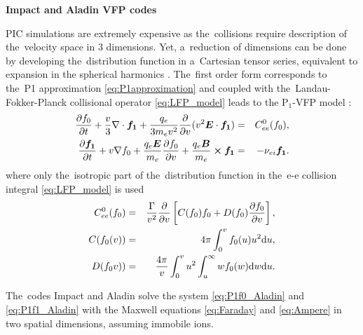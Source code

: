 \textbf{Impact and Aladin VFP codes}

PIC simulations are extremely expensive as the~collisions require description 
of the~velocity space in 3 dimensions. Yet, a~reduction of dimensions can be 
done by developing the~distribution function in a~Cartesian tensor series, 
equivalent to expansion in the spherical harmonics \cite{Johnston_PR1960}.
The~first order form corresponds to the~P1 approximation 
\eqref{eq:P1approximation} and coupled with
the~Landau-Fokker-Planck collisional operator 
\eqref{eq:LFP_model} leads to the P$_1$-VFP model 
\cite{Johnston_PR1960, Kingham_JCP2004}:
\begin{eqnarray}
\frac{\partial f_0}{\partial t}+\frac{v}{3}\nabla \cdot {\boldsymbol{f_1}}
+\frac{q_e}{3m_ev^2}\frac{\partial}{\partial v}(v^2\boldsymbol{E}\cdot {\boldsymbol{f_1}})
&=&
C^0_{ee}(f_0) ,
 \label{eq:P1f0_Aladin}\\
\frac{\partial {\boldsymbol{f_1}}}{\partial t}+v\nabla f_0
+ \frac{q_e\boldsymbol{E}}{m_e}\frac{\partial f_0}{\partial v}
+\frac{q_e\boldsymbol{B}}{m_e}\boldsymbol{\times} {\boldsymbol{f_1}} 
&=&
- \nu_{ei}{\boldsymbol{f_1}} .
\label{eq:P1f1_Aladin}
\end{eqnarray}
where only the~isotropic part of the~distribution function in 
the~e-e collision integral \eqref{eq:LFP_model} is used
\begin{eqnarray} 
C^0_{ee}(f_0) &=& \frac{\Gamma}{v^2}\frac{\partial}{\partial v}
\left[C(f_0)f_0+D(f_0)\frac{\partial f_0}{\partial v}\right] ,
\label{eq:C0_collision_operator}
\\
C(f_0(v)) &=& 4\pi\int_0^v f_0(u) u^2 \text{d} u ,
\nonumber
\\
D(f_0v)) &=& \frac{4\pi}{v}\int_0^v u^2\int_u^\infty w f_0(w) 
\text{d} w \text{d} u .
\nonumber
\end{eqnarray}

The~codes Impact and Aladin solve the system \eqref{eq:P1f0_Aladin} 
and \eqref{eq:P1f1_Aladin} with the Maxwell equations  
\eqref{eq:Faraday} and \eqref{eq:Ampere} in two spatial dimensions, 
assuming immobile ions.

